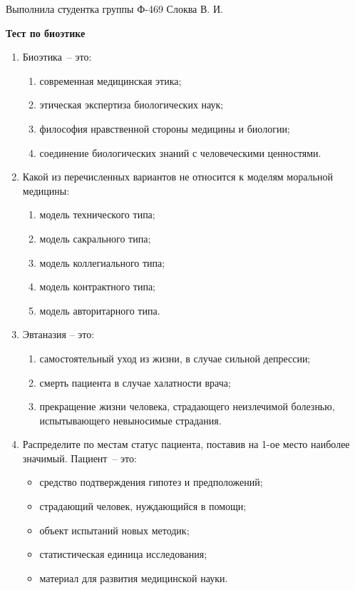 \documentclass[12pt,pscyr]{hedwork}
\renewcommand{\labelenumii}{\asbuk{enumii})}
\newcommand{\itempo}{\stepcounter{enumii}\item[\bfseries\labelenumii]}
\begin{document}
  
  \begin{flushright}
    Выполнила студентка группы Ф-469 Слоква В. И.
  \end{flushright}
  \vspace{-2em}
  \begin{center}
    \bfseries Тест по биоэтике
  \end{center}

  \begin{enumerate}
    \item Биоэтика~-- это:
      \begin{enumerate}
        \item современная медицинская этика;
        \item этическая экспертиза биологических наук;
        \itempo философия нравственной стороны медицины и биологии;
        \item соединение биологических знаний с человеческими ценностями.
      \end{enumerate}
      
    \item Какой из перечисленных вариантов не относится к моделям моральной медицины:
      \begin{enumerate}
        \item модель технического типа;
        \item модель сакрального типа;
        \item модель коллегиального типа;
        \item модель контрактного типа;
        \itempo модель авторитарного типа.
      \end{enumerate}

    \item Эвтаназия -- это:
      \begin{enumerate}
        \item самостоятельный уход из жизни, в случае сильной депрессии;
        \item смерть пациента в случае халатности врача;
        \itempo прекращение жизни человека, страдающего неизлечимой болезнью,
          испытывающего невыносимые страдания.
      \end{enumerate} 

    \item Распределите по местам статус пациента, поставив на 1-ое место
      наиболее значимый. Пациент~-- это:
      \begin{itemize}
        \item средство подтверждения гипотез и предположений;
        \item страдающий человек, нуждающийся в помощи;
        \item объект испытаний новых методик;
        \item статистическая единица исследования;
        \item материал для развития медицинской науки.
      \end{itemize}


\end{enumerate}
\end{document}
